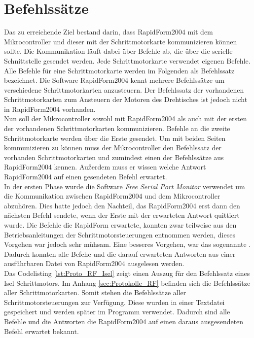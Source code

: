 \section{Befehlssätze} 
\label{sec:Protokolle}
Das zu erreichende Ziel bestand darin, dass RapidForm2004 mit dem Mikrocontroller und dieser mit der Schrittmotorkarte kommunizieren können sollte. Die Kommunikation läuft dabei über Befehle ab, die über die serielle Schnittstelle gesendet werden. 
Jede Schrittmotorkarte verwendet eigenen Befehle. Alle Befehle für eine Schrittmotorkarte werden im Folgenden als Befehlssatz bezeichnet. Die Software RapidForm2004 kennt mehrere Befehlssätze um verschiedene Schrittmotorkarten anzusteuern. Der Befehlssatz der vorhandenen Schrittmotorkarten zum Ansteuern der Motoren des Drehtisches ist jedoch nicht in RapidForm2004 vorhanden.\\
Nun soll der Mikrocontroller sowohl mit RapidForm2004 als auch mit der ersten der vorhandenen Schrittmotorkarten kommunizieren. Befehle an die zweite Schrittmotorkarte werden über die Erste gesendet. Um mit beiden Seiten kommunizieren zu können muss der Mikrocontroller den Befehlssatz der vorhanden Schrittmotorkarten und zumindest einen der Befehlssätze aus RapidForm2004 kennen. Außerdem muss er wissen welche Antwort RapidForm2004 auf einen gesendeten Befehl erwartet. \\
In der ersten Phase wurde die Software \emph{Free Serial Port Monitor} verwendet um die Kommunikation zwischen RapidForm2004 und dem Mikrocontroller abzuhören. Dies hatte jedoch den Nachteil, das RapidForm2004 erst dann den nächsten Befehl sendete, wenn der Erste mit der erwarteten Antwort quittiert wurde. Die Befehle die RapidForm erwartete, konnten zwar teilweise aus den Betriebsanleitungen der Schrittmotorsteuerungen entnommen werden, dieses Vorgehen war jedoch sehr mühsam. Eine besseres Vorgehen, war das sogenannte . Dadurch konnten alle Befehe und die darauf erwarteten Antworten aus einer ausführbaren Datei von RapidForm2004 ausgelesen werden.\\
Das Codelisting \ref{lst:Proto_RF_Isel} zeigt einen Auszug für den Befehlssatz eines Isel Schrittmotors. Im Anhang \ref{sec:Protokolle_RF} befinden sich die Befehlssätze aller Schrittmotorkarten. Somit stehen die Befehlssätze aller Schrittmotorsteuerungen zur Verfügung. Diese wurden in einer Textdatei gespeichert und werden später im Programm verwendet. Dadurch sind alle Befehle und die Antworten die RapidForm2004 auf einen daraus ausgesendeten Befehl erwartet bekannt.
